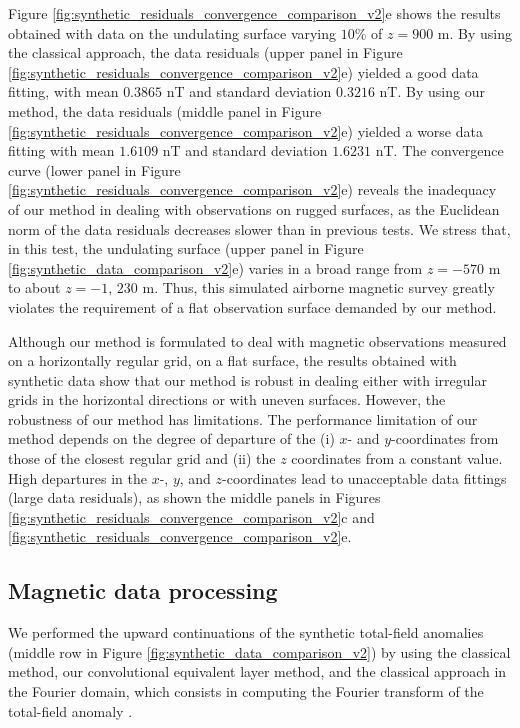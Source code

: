 \documentclass[manuscript]{geophysics}
\begin{document}
	Figure \ref{fig:synthetic_residuals_convergence_comparison_v2}e shows the results obtained
	with data on the undulating surface varying $10\%$ of $z = 900$ m.
	By using the classical approach, the data residuals (upper panel in 
	Figure \ref{fig:synthetic_residuals_convergence_comparison_v2}e) 
	yielded a good data fitting, with mean $0.3865$ nT and standard deviation $0.3216$ nT. 
	By using our method, the data residuals (middle panel in 
	Figure \ref{fig:synthetic_residuals_convergence_comparison_v2}e) yielded a worse data fitting 
	with mean $1.6109$ nT and standard deviation $1.6231$ nT.
	The convergence curve (lower panel in Figure \ref{fig:synthetic_residuals_convergence_comparison_v2}e)
	reveals the inadequacy of our method in dealing with observations on rugged surfaces, as 
	the Euclidean norm of the data residuals decreases slower than in previous tests. 
	We stress that, in this test, the undulating surface (upper panel in Figure 
	\ref{fig:synthetic_data_comparison_v2}e) varies in a broad range from $z = - 570$ m to about 
	$z = -1,\, 230$ m. Thus, this simulated airborne magnetic survey greatly violates the requirement 
	of a flat observation surface demanded by our method.
	
	Although our method is formulated to deal with magnetic observations measured on 
	a horizontally regular grid, on a flat surface, the results obtained with synthetic 
	data show that our method is robust in dealing either with irregular grids in the 
	horizontal directions or with uneven surfaces.
	However, the robustness of our method has limitations.
	The performance limitation of our method depends on the degree of 
	departure of the (i) $x$- and $y$-coordinates from those of the closest 
	regular grid and (ii) the $z$ coordinates from a constant value.
	High departures in the $x$-, $y$, and $z$-coordinates lead to unacceptable 
	data fittings (large data residuals), as shown the middle panels in Figures 
	\ref{fig:synthetic_residuals_convergence_comparison_v2}c and
	\ref{fig:synthetic_residuals_convergence_comparison_v2}e.
	
	\subsection*{Magnetic data processing}
	
	We performed the upward continuations of the synthetic total-field anomalies 
	(middle row in Figure \ref{fig:synthetic_data_comparison_v2}) by using 
	the classical method, our convolutional equivalent layer method, and 
	the classical approach in the Fourier domain,
	which consists in computing the Fourier transform of the total-field anomaly 
	\citep[e.g.,][ p. 317]{blakely1996}. 
	
\end{document}
